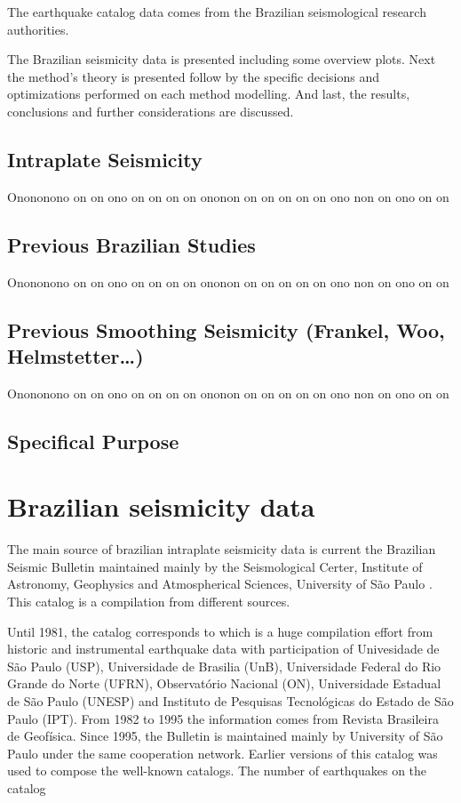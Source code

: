 \documentclass[draft, grl]{agutex}
\begin{document}
\begin{article}
The earthquake catalog data comes from the Brazilian seismological research authorities.

The Brazilian seismicity data is presented including some overview plots. Next the method's theory is presented follow by the specific decisions and optimizations performed on each method modelling. And last, the results, conclusions and further considerations are discussed.


\subsection{Intraplate Seismicity}

Onononono on on ono on on on on ononon on on on on on ono non on ono on on

\subsection{Previous Brazilian Studies}

Onononono on on ono on on on on ononon on on on on on ono non on ono on on

\subsection{Previous Smoothing Seismicity (Frankel, Woo, Helmstetter\ldots)}

Onononono on on ono on on on on ononon on on on on on ono non on ono on on

\subsection{Specifical Purpose}

\section{Brazilian seismicity data}

The main source of brazilian intraplate seismicity data is current the Brazilian Seismic Bulletin maintained mainly by the Seismological Certer, Institute of Astronomy, Geophysics and Atmospherical Sciences, University of São Paulo \citep{bsb_2014}. This catalog is a compilation from different sources.

Until 1981, the catalog corresponds to \citet{berrocal_1984} which is a huge compilation effort from historic and instrumental earthquake data with participation of Univesidade de São Paulo (USP), Universidade de Brasilia (UnB), Universidade Federal do Rio Grande do Norte (UFRN), Observatório Nacional (ON), Universidade Estadual de São Paulo (UNESP) and Instituto de Pesquisas Tecnológicas do Estado de São Paulo (IPT). From 1982 to 1995 the information comes from Revista Brasileira de Geofísica. Since 1995, the Bulletin is maintained mainly by University of São Paulo under the same cooperation network. Earlier versions of this catalog was used to compose the well-known \citet{ceresis_1985, ceresis_1995} catalogs. The number of earthquakes on the catalog 


\end{article}
\end{document}
